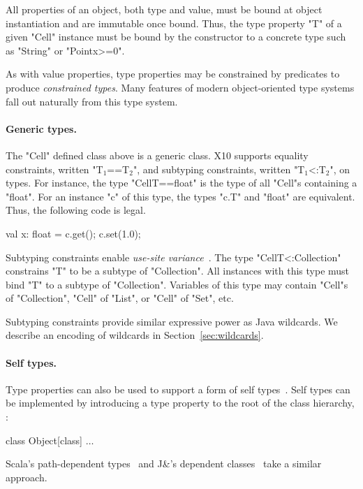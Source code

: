 \documentclass[preprint,nocopyrightspace,9pt]{sigplanconf}
\begin{document}
All properties of an object, both type and value, must be bound at object
instantiation and are immutable once bound.  Thus, the type
property \xcd"T" of a given \xcd"Cell" instance must be bound
by the constructor
to a concrete type such as \xcd"String" or \xcd"Point{x>=0}".

As with value properties, type properties may be constrained
by predicates to produce \emph{constrained types}.
Many features of modern object-oriented type systems fall out
naturally from this type system.

\paragraph{Generic types.}
The \xcd"Cell" defined class above is a generic class.
X10 supports
equality constraints, written \xcdmath"T$_1$==T$_2$", and
subtyping constraints, written \xcdmath"T$_1$<:T$_2$", on types.
For instance,
the type \xcd"Cell{T==float}" is the type of all \xcd"Cell"s
containing a \xcd"float".  For an instance \xcd"c" of this type,
the types \xcd"c.T" and \xcd"float" are equivalent.  Thus, the
following code is legal.
\begin{xten}
val x: float = c.get();
c.set(1.0);
\end{xten}

Subtyping constraints enable \emph{use-site variance}~\cite{variance}.
The type \xcd"Cell{T<:Collection}"
constrains \xcd"T" to be a subtype of \xcd"Collection".
All instances with this type must bind \xcd"T" to a subtype of
\xcd"Collection".
Variables of this type may contain \xcd"Cell"s of
\xcd"Collection", \xcd"Cell" of \xcd"List",
or \xcd"Cell" of \xcd"Set", etc.

Subtyping constraints provide similar expressive power as Java
wildcards.  We describe an encoding of wildcards in
Section~\ref{sec:wildcards}. 

\paragraph{Self types.}
Type properties can also be used to support a form of self
types~\cite{bruce-binary,bsg95}.
%
Self types can be implemented by introducing a
type property  to the root of the class hierarchy, :
\begin{xtenmath}
class Object[class] { $\dots$ }
\end{xtenmath}
Scala's path-dependent types~\cite{scala} and J\&'s
dependent classes~\cite{nqm06}
take a similar approach.
\end{document}
